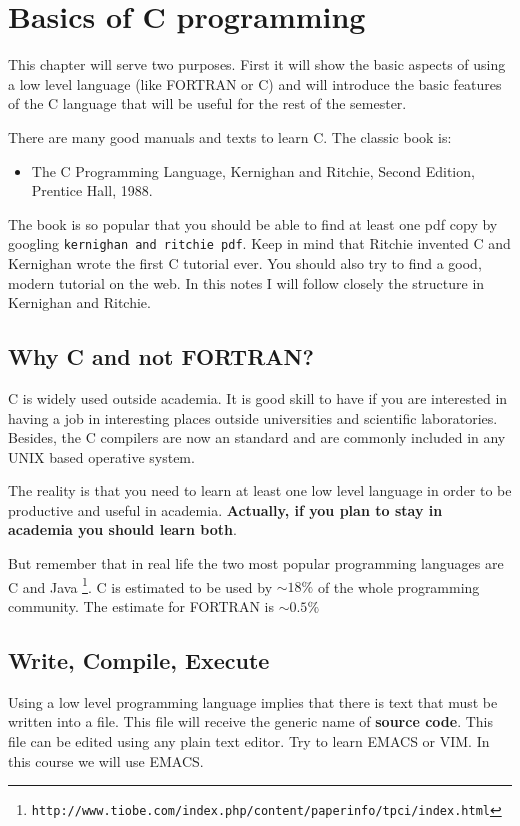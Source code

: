 \documentclass{article}
\begin{document}
\setcounter{section}{1}
\section{Basics of C programming}
This chapter will serve two purposes. First it will show the basic aspects of using a low level language (like FORTRAN or C) and will introduce the basic features of the C language that will be useful for the rest of the semester.

There are many good manuals and texts to learn C. The classic book is: 
\begin{itemize}
\item The C Programming Language, Kernighan and Ritchie, Second Edition, Prentice Hall, 1988.
\end{itemize}

The book is so popular that you should be able to find at least one pdf copy by googling \verb"kernighan and ritchie pdf". Keep in mind that Ritchie invented C and Kernighan wrote the first C tutorial ever. You should also try to find a good, modern tutorial on the web. In this notes I will follow closely the structure in Kernighan and Ritchie.

\subsection*{Why C and not FORTRAN?}
C is widely used outside academia. It is good skill to have if you are interested in having a job in interesting places outside universities and scientific laboratories. Besides, the C compilers are now an standard and are commonly included in any UNIX based operative system.

The reality is that you need to learn at least one low level language in order to be productive and useful in academia. {\bf Actually, if you plan to stay in academia you should learn both}.

But remember that in real life the two most popular programming languages are C and Java \footnote{\texttt{http://www.tiobe.com/index.php/content/paperinfo/tpci/index.html}}. C is estimated to be used by $\sim 18\%$ of the whole programming community. The estimate for FORTRAN is $\sim 0.5\%$


\subsection{Write, Compile, Execute}
Using a low level programming language implies that there is text that must be written into a file. This file will receive the generic name of {\bf source code}. This file can be edited using any plain text editor. Try to learn EMACS or VIM. In this course we will use EMACS.
\end{document}
